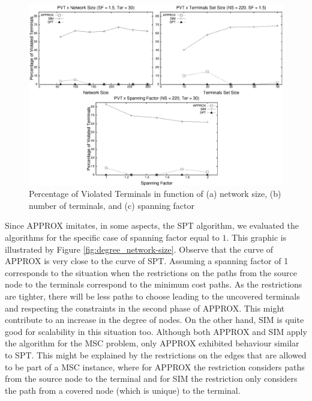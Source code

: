 \begin{figure}[!th]
\centering
\includegraphics[scale=0.63]{imagens/violatedNodesRatio-220-3_graficos_nao_alinhados}
\caption{Percentage of Violated Terminals in function of (a) network size, (b) number of terminals, and (c) spanning factor}
\label{fig:violated-terminals_abscissae}
\end{figure}

Since APPROX imitates, in some aspects, the SPT algorithm, we evaluated the algorithms for the specific case of 
spanning factor equal to $1$. 
This graphic is illustrated by Figure \ref{fig:degree_network-size}. Observe that the curve of APPROX  
is very close to the curve of SPT. 
Assuming a spanning factor of 1 corresponds to the situation when the restrictions on the paths from the source node to
the terminals correspond to the minimum cost paths.
As the restrictions are tighter, there will be less paths to choose
leading to the uncovered terminals and respecting the constraints in the second phase of APPROX. This might contribute
to an increase in the degree of nodes. 
On the other hand, SIM is quite good for scalability in this situation too. 
Although both APPROX and SIM apply the algorithm for the MSC problem, only APPROX exhibited behaviour similar to SPT. This might be explained by the restrictions 
on the edges that are allowed to be part of a MSC instance, where for APPROX the restriction considers paths from the source node to the terminal and for SIM the restriction only considers 
the path from a covered node (which is unique) to the terminal. 


